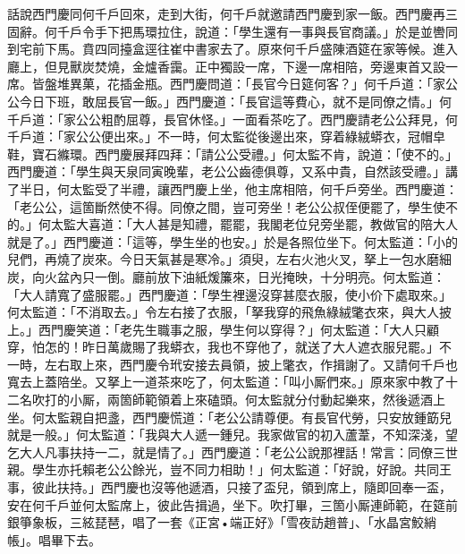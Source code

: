 話說西門慶同何千戶回來，走到大街，何千戶就邀請西門慶到家一飯。西門慶再三固辭。何千戶令手下把馬環拉住，說道：「學生還有一事與長官商議。」於是並轡同到宅前下馬。賁四同擡盒逕往崔中書家去了。原來何千戶盛陳酒筵在家等候。進入廳上，但見獸炭焚燒，金爐香靄。正中獨設一席，下邊一席相陪，旁邊東首又設一席。皆盤堆異菓，花插金瓶。西門慶問道：「長官今日筵何客？」何千戶道：「家公公今日下班，敢屈長官一飯。」西門慶道：「長官這等費心，就不是同僚之情。」何千戶道：「家公公粗酌屈尊，長官休怪。」一面看茶吃了。西門慶請老公公拜見，何千戶道：「家公公便出來。」不一時，何太監從後邊出來，穿着綠絨蟒衣，冠帽皁鞋，寶石縧環。西門慶展拜四拜：「請公公受禮。」何太監不肯，說道：「使不的。」{}西門慶道：「學生與天泉同寅晚輩，老公公齒德俱尊，又系中貴，自然該受禮。」講了半日，何太監受了半禮，讓西門慶上坐，他主席相陪，何千戶旁坐。西門慶道：「老公公，這箇斷然使不得。同僚之間，豈可旁坐！老公公叔侄便罷了，學生使不的。」何太監大喜道：「大人甚是知禮，{}罷罷，我閣老位兒旁坐罷，教做官的陪大人就是了。」西門慶道：「這等，學生坐的也安。」於是各照位坐下。何太監道：「小的兒們，{}再燒了炭來。今日天氣甚是寒冷。」須臾，左右火池火叉，拏上一包水磨細炭，向火盆內只一倒。廳前放下油紙煖簾來，日光掩映，十分明亮。何太監道：「大人請寬了盛服罷。」西門慶道：「學生裡邊沒穿甚麼衣服，使小价下處取來。」何太監道：「不消取去。」令左右接了衣服，「拏我穿的飛魚綠絨氅衣來，與大人披上。」西門慶笑道：「老先生職事之服，學生何以穿得？」{}何太監道：「大人只顧穿，怕怎的！昨日萬歲賜了我蟒衣，我也不穿他了，就送了大人遮衣服兒罷。」不一時，左右取上來，西門慶令玳安接去員領，披上氅衣，作揖謝了。又請何千戶也寬去上蓋陪坐。又拏上一道茶來吃了，何太監道：「叫小厮們來。」{}{}原來家中教了十二名吹打的小厮，兩箇師範領着上來磕頭。何太監就分付動起樂來，然後遞酒上坐。何太監親自把盞，西門慶慌道：「老公公請尊便。有長官代勞，只安放鍾筯兒就是一般。」何太監道：「我與大人遞一鍾兒。我家做官的初入蘆葦，不知深淺，望乞大人凡事扶持一二，就是情了。」{}西門慶道：「老公公說那裡話！常言：同僚三世親。學生亦托賴老公公餘光，豈不同力相助！」{}何太監道：「好說，好說。共同王事，彼此扶持。」西門慶也沒等他遞酒，只接了盃兒，領到席上，隨即回奉一盃，安在何千戶並何太監席上，彼此告揖過，坐下。吹打畢，三箇小厮連師範，在筵前銀箏象板，三絃琵琶，唱了一套《正宮•端正好》「雪夜訪趙普」、「水晶宮鮫綃帳」。唱畢下去。

